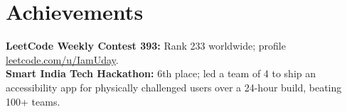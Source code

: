 \section{Achievements}
\small \textbf{LeetCode Weekly Contest 393:} Rank 233 worldwide; profile \href{https://leetcode.com/u/IamUday/}{leetcode.com/u/IamUday}. \\
\textbf{Smart India Tech Hackathon:} 6th place; led a team of 4 to ship an accessibility app for physically challenged users over a 24-hour build, beating 100+ teams.
